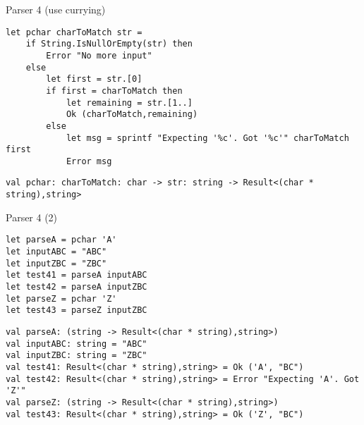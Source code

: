 \documentclass[t]{beamer}
\begin{document}
\begin{frame}[label={sec:org7b98d91},fragile]{Parser 4 (use currying)}
 \begin{verbatim}
let pchar charToMatch str = 
    if String.IsNullOrEmpty(str) then
        Error "No more input"
    else
        let first = str.[0] 
        if first = charToMatch then
            let remaining = str.[1..]
            Ok (charToMatch,remaining)
        else
            let msg = sprintf "Expecting '%c'. Got '%c'" charToMatch first
            Error msg
\end{verbatim}

\begin{verbatim}
val pchar: charToMatch: char -> str: string -> Result<(char * string),string>
\end{verbatim}
\end{frame}

\begin{frame}[label={sec:org7f066a4},fragile]{Parser 4 (2)}
 \begin{verbatim}
let parseA = pchar 'A'
let inputABC = "ABC"
let inputZBC = "ZBC"
let test41 = parseA inputABC
let test42 = parseA inputZBC
let parseZ = pchar 'Z' 
let test43 = parseZ inputZBC
\end{verbatim}

\begin{verbatim}
val parseA: (string -> Result<(char * string),string>)
val inputABC: string = "ABC"
val inputZBC: string = "ZBC"
val test41: Result<(char * string),string> = Ok ('A', "BC")
val test42: Result<(char * string),string> = Error "Expecting 'A'. Got 'Z'"
val parseZ: (string -> Result<(char * string),string>)
val test43: Result<(char * string),string> = Ok ('Z', "BC")
\end{verbatim}
\end{frame}
\end{document}

